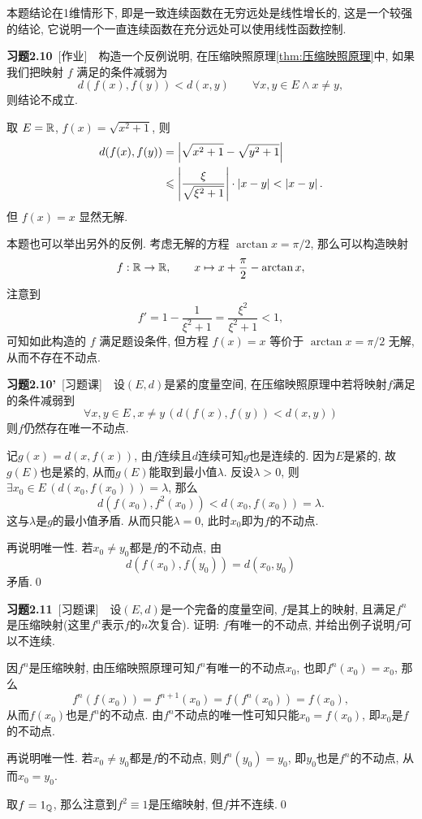	\begin{Remark}
		本题结论在1维情形下, 即是一致连续函数在无穷远处是线性增长的, 这是一个较强的结论, 它说明一个一直连续函数在充分远处可以使用线性函数控制.
	\end{Remark}
	
	\textbf{习题2.10}\ [作业]\ \ 构造一个反例说明, 在压缩映照原理\ref{thm:压缩映照原理}中, 如果我们把映射 $ f $ 满足的条件减弱为
	\[
		d(f(x), f(y))<d(x, y)\qquad \forall x, y\in E\wedge x\neq y,
	\]
	则结论不成立.

	\begin{Solution}
		取 $ E=\mathbb{R} $, $ f(x)=\sqrt{x^{2}+1} $, 则
		\[
			\begin{aligned}
				d(f(x), f(y)) & =\left| \sqrt{x^{2}+1}-\sqrt{y^{2}+1} \right| \\
				& \leqslant\left| \frac{\xi}{\sqrt{\xi^{2}+1}} \right| \cdot\left| x-y \right| <\left| x-y \right| .
			\end{aligned}
		\]
		但 $ f(x)=x $ 显然无解.
	\end{Solution}
	\begin{Remark}
		本题也可以举出另外的反例. 考虑无解的方程 $ \arctan x=\pi/2 $, 那么可以构造映射
		\[
			f : \mathbb{R}\to\mathbb{R},\qquad x\mapsto x+\frac\pi 2-\arctan x,
		\]
		注意到
		\[
			f'=1-\frac{1}{\xi^2+1}=\frac{\xi^2}{\xi^2+1}<1,
		\]
		可知如此构造的 $ f $ 满足题设条件, 但方程 $ f(x)=x $ 等价于 $ \arctan x=\pi/2 $ 无解, 从而不存在不动点.
	\end{Remark}
	
	\textbf{习题2.10'}\ [习题课]\ \ 设$ (E,d) $是紧的度量空间, 在压缩映照原理中若将映射$ f $满足的条件减弱到
	\[
	\forall x,y\in E\,,x\ne y\,(d(f(x),f(y))<d(x,y))
	\]
	则$ f $仍然存在唯一不动点.
	\begin{Proof}
	记$ g(x)=d(x,f(x)) $, 由$ f $连续且$ d $连续可知$ g $也是连续的. 因为$ E $是紧的, 故$ g(E) $也是紧的, 从而$ g(E) $能取到最小值$ \lambda $. 反设$ \lambda>0 $, 则$ \exists x_0\in E\,(d(x_0,f(x_0)))=\lambda $, 那么
	\[
	d(f(x_0),f^2(x_0))<d(x_0,f(x_0))=\lambda.
	\]
	这与$ \lambda $是$ g $的最小值矛盾. 从而只能$ \lambda=0 $, 此时$ x_0 $即为$ f $的不动点.
	
	再说明唯一性. 若$ x_0\ne y_0 $都是$ f $的不动点, 由
	\[
	d(f(x_0),f(y_0))=d(x_0,y_0)
	\]
	矛盾.\qed
	\end{Proof}
	
	\textbf{习题2.11}\ [习题课]\ \ 设$ (E,d) $是一个完备的度量空间, $ f $是其上的映射, 且满足$ f^n $是压缩映射(这里$ f^n $表示$ f $的$ n $次复合). 证明: $ f $有唯一的不动点, 并给出例子说明$ f $可以不连续.
	\begin{Proof}
	因$ f^n $是压缩映射, 由压缩映照原理可知$ f^n $有唯一的不动点$ x_0 $, 也即$ f^n(x_0)=x_0 $, 那么
	\[
	f^n(f(x_0))=f^{n+1}(x_0)=f(f^n(x_0))=f(x_0),
	\]
	从而$ f(x_0) $也是$ f^n $的不动点. 由$ f^n $不动点的唯一性可知只能$ x_0=f(x_0) $, 即$ x_0 $是$ f $的不动点.
	
	再说明唯一性. 若$ x_0\ne y_0 $都是$ f $的不动点, 则$ f^n(y_0)=y_0 $, 即$ y_0 $也是$ f^n $的不动点, 从而$ x_0=y_0 $.
	
	取$ f=1_{\mathbb{Q}} $, 那么注意到$ f^2\equiv 1 $是压缩映射, 但$ f $并不连续.\qed
	\end{Proof}
	

